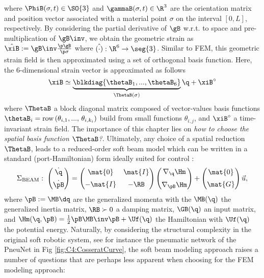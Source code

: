 %
where $\PhiB(\sigma,t) \in \SO{3}$ and $\gammaB(\sigma,t) \in \R^3$ are the orientation matrix and position vector associated with a material point $\sigma$ on the interval $[0,L]$, respectively. By considering the partial derivative of $\gB$ w.r.t. to space and pre-multiplication of $\gB\inv$, we obtain the geometric strain as $\hat{\xiB}:=\gB\inv\frac{\p \gB}{\p \sigma}$ where $\hat{(\cdot)}:\R^6 \to \seg{3}$. Similar to FEM, this geometric strain field is then approximated using a set of orthogonal basis function. Here, the 6-dimensional strain vector is approximated as follows
%
\begin{equation}
  \xiB \simeq \underbrace{\blkdiag{\thetaB_1,...,\thetaB_6}}_{\ThetaB(\sigma)} \q + \xiB^{\circ}
\end{equation}
%
where $\ThetaB$ a block diagonal matrix composed of vector-values basis functions $\thetaB_i = \textrm{row}\left(\theta_{i,1}, ...,\,\theta_{i,k_i} \right)$ build from small functions $\theta_{i,j}$, and $\xiB^{\circ}$ a time-invariant strain field. The importance of this chapter lies on \textit{how to choose the spatial basis function $\ThetaB$?}. Ultimately, any choice of a spatial reduction $\ThetaB$, leads to a reduced-order soft beam model which can be written in a standard (port-Hamiltonian) form ideally suited for control \cite{Caasenbrood2021,Franco2020}: 
%
\begin{equation}
  \Sigma_{\textrm{BEAM}}: \; \begin{pmatrix} \dot{\q} \\[0.5em] \dot{\pB} \end{pmatrix} = \begin{pmatrix} \mat{0} & \mat{I} \\[0.5em] - \mat{I} & -\RB \end{pmatrix} \begin{pmatrix} \nabla_{\q} \Hm \\[0.6em] \nabla_{\pB}\Hm \end{pmatrix} + \begin{pmatrix} \mat{0} \\[0.5em] \mat{G}\end{pmatrix}  \vec{u},
  \label{eq:C3:modelBEAM}
\end{equation}
%
where $\pB:=\MB \dq$ are the generalized momenta with the $\MB(\q)$ the generalized inertia matrix, $\RB \succ 0$ a damping matrix, $\GB(\q)$ an input matrix, and $\Hm(\q,\pB) = \frac{1}{2}\pB \MB\inv \pB + \Uf(\q)$ the Hamiltonian with $\Uf(\q)$ the potential energy. Naturally, by considering the structural complexity in the original soft robotic system, see for instance the pneumatic network of the PneuNet in Fig \ref{fig:C4:CosseratCurve}, the soft beam modeling approach raises a number of questions that are perhaps less apparent when choosing for the FEM modeling approach:
